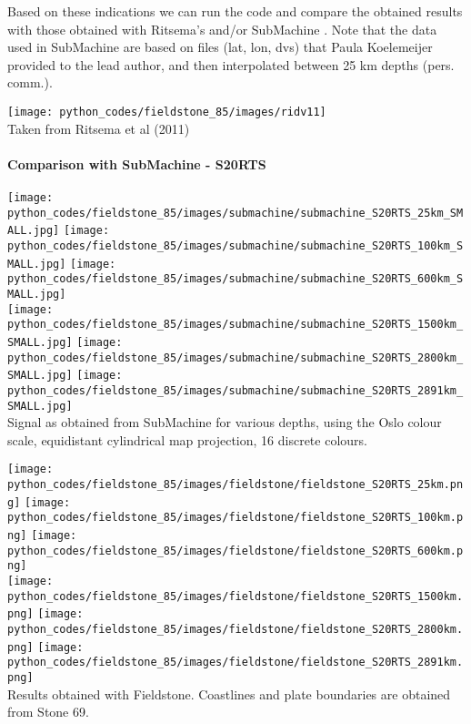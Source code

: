 Based on these indications we can run the code and compare the obtained results 
with those obtained with Ritsema's and/or SubMachine \cite{homs18}.
Note that the data used in SubMachine are based on files (lat, lon, dvs) that 
Paula Koelemeijer provided to the lead author, 
and then interpolated between 25 km depths (pers. comm.).

\begin{center}
\texttt{[image: python\_codes/fieldstone\_85/images/ridv11]}\\
{\captionfont Taken from Ritsema et al (2011) \cite{ridv11}}
\end{center}


\newpage
\paragraph{Comparison with SubMachine - S20RTS}

\begin{center}
\texttt{[image: python\_codes/fieldstone\_85/images/submachine/submachine\_S20RTS\_25km\_SMALL.jpg]}
\texttt{[image: python\_codes/fieldstone\_85/images/submachine/submachine\_S20RTS\_100km\_SMALL.jpg]}
\texttt{[image: python\_codes/fieldstone\_85/images/submachine/submachine\_S20RTS\_600km\_SMALL.jpg]}\\
\texttt{[image: python\_codes/fieldstone\_85/images/submachine/submachine\_S20RTS\_1500km\_SMALL.jpg]}
\texttt{[image: python\_codes/fieldstone\_85/images/submachine/submachine\_S20RTS\_2800km\_SMALL.jpg]}
\texttt{[image: python\_codes/fieldstone\_85/images/submachine/submachine\_S20RTS\_2891km\_SMALL.jpg]}\\
{\captionfont Signal as obtained from SubMachine for various depths, using the Oslo colour scale, equidistant cylindrical map projection, 
16 discrete colours.}
\end{center}


\begin{center}
\texttt{[image: python\_codes/fieldstone\_85/images/fieldstone/fieldstone\_S20RTS\_25km.png]}
\texttt{[image: python\_codes/fieldstone\_85/images/fieldstone/fieldstone\_S20RTS\_100km.png]}
\texttt{[image: python\_codes/fieldstone\_85/images/fieldstone/fieldstone\_S20RTS\_600km.png]}\\
\texttt{[image: python\_codes/fieldstone\_85/images/fieldstone/fieldstone\_S20RTS\_1500km.png]}
\texttt{[image: python\_codes/fieldstone\_85/images/fieldstone/fieldstone\_S20RTS\_2800km.png]}
\texttt{[image: python\_codes/fieldstone\_85/images/fieldstone/fieldstone\_S20RTS\_2891km.png]}\\
{\captionfont Results obtained with Fieldstone. Coastlines and plate boundaries are obtained from Stone 69.}
\end{center}

